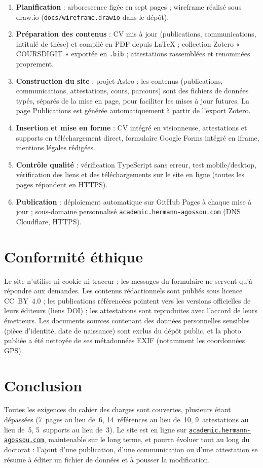 \documentclass[11pt,a4paper]{article}
\newcommand{\siteurl}{\href{https://academic.hermann-agossou.com}{\texttt{academic.hermann-agossou.com}}}
\begin{document}
\begin{enumerate}[itemsep=2pt]
  \item \textbf{Planification} : arborescence figée en sept pages ; wireframe
    réalisé sous draw.io (\texttt{docs/wireframe.drawio} dans le dépôt).
  \item \textbf{Préparation des contenus} : CV mis à jour (publications,
    communications, intitulé de thèse) et compilé en PDF depuis LaTeX ;
    collection Zotero « COURSDIGIT » exportée en \texttt{.bib} ; attestations
    rassemblées et renommées proprement.
  \item \textbf{Construction du site} : projet Astro ; les contenus
    (publications, communications, attestations, cours, parcours) sont des
    fichiers de données typés, séparés de la mise en page, pour faciliter les
    mises à jour futures. La page Publications est générée automatiquement à
    partir de l'export Zotero.
  \item \textbf{Insertion et mise en forme} : CV intégré en visionneuse,
    attestations et supports en téléchargement direct, formulaire Google Forms
    intégré en iframe, mentions légales rédigées.
  \item \textbf{Contrôle qualité} : vérification TypeScript sans erreur, test
    mobile/desktop, vérification des liens et des téléchargements sur le site
    en ligne (toutes les pages répondent en HTTPS).
  \item \textbf{Publication} : déploiement automatique sur GitHub Pages à
    chaque mise à jour ; sous-domaine personnalisé
    \texttt{academic.hermann-agossou.com} (DNS Cloudflare, HTTPS).
\end{enumerate}

\section{Conformité éthique}

Le site n'utilise ni cookie ni traceur ; les messages du formulaire ne servent
qu'à répondre aux demandes. Les contenus rédactionnels sont publiés sous
licence CC~BY~4.0 ; les publications référencées pointent vers les versions
officielles de leurs éditeurs (liens DOI) ; les attestations sont reproduites
avec l'accord de leurs émetteurs. Les documents sources contenant des données
personnelles sensibles (pièce d'identité, date de naissance) sont exclus du
dépôt public, et la photo publiée a été nettoyée de ses métadonnées EXIF
(notamment les coordonnées GPS).

\section{Conclusion}

Toutes les exigences du cahier des charges sont couvertes, plusieurs étant
dépassées (7~pages au lieu de~6, 14~références au lieu de~10, 9~attestations au
lieu de~5, 5~supports au lieu de~3). Le site est en ligne sur \siteurl,
maintenable sur le long terme, et pourra évoluer tout au long du doctorat :
l'ajout d'une publication, d'une communication ou d'une attestation se résume à
éditer un fichier de données et à pousser la modification.
\end{document}
